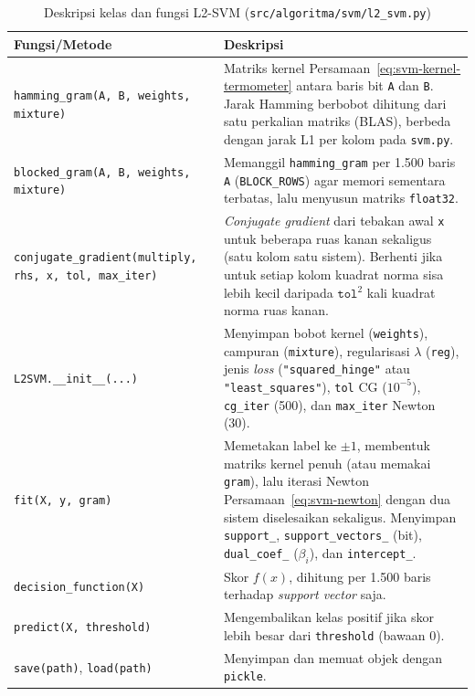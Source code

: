 \begin{table}[H]
	\centering
	\caption{Deskripsi kelas dan fungsi L2-SVM (\texttt{src/algoritma/svm/l2\_svm.py})}
	\label{tab:svm-fungsi-l2}
	\small
	\begin{tabularx}{\textwidth}{>{\raggedright\arraybackslash}p{4.8cm} Y}
		\toprule
		\textbf{Fungsi/Metode} & \textbf{Deskripsi} \\
		\midrule
		\texttt{hamming\_gram(A, B, weights, mixture)} & Matriks kernel Persamaan~\eqref{eq:svm-kernel-termometer} antara baris bit \texttt{A} dan \texttt{B}. Jarak Hamming berbobot dihitung dari satu perkalian matriks (BLAS), berbeda dengan jarak L1 per kolom pada \texttt{svm.py}. \\
		\texttt{blocked\_gram(A, B, weights, mixture)} & Memanggil \texttt{hamming\_gram} per 1.500 baris \texttt{A} (\texttt{BLOCK\_ROWS}) agar memori sementara terbatas, lalu menyusun matriks \texttt{float32}. \\
		\texttt{conjugate\_gradient(multiply, rhs, x, tol, max\_iter)} & \textit{Conjugate gradient} \cite{hestenes1952cg} dari tebakan awal \texttt{x} untuk beberapa ruas kanan sekaligus (satu kolom satu sistem). Berhenti jika untuk setiap kolom kuadrat norma sisa lebih kecil daripada $\texttt{tol}^2$ kali kuadrat norma ruas kanan. \\
		\texttt{L2SVM.\_\_init\_\_(...)} & Menyimpan bobot kernel (\texttt{weights}), campuran (\texttt{mixture}), regularisasi $\lambda$ (\texttt{reg}), jenis \textit{loss} (\texttt{"squared\_hinge"} atau \texttt{"least\_squares"}), \texttt{tol} CG ($10^{-5}$), \texttt{cg\_iter} (500), dan \texttt{max\_iter} Newton (30). \\
		\texttt{fit(X, y, gram)} & Memetakan label ke $\pm 1$, membentuk matriks kernel penuh (atau memakai \texttt{gram}), lalu iterasi Newton Persamaan~\eqref{eq:svm-newton} dengan dua sistem diselesaikan sekaligus. Menyimpan \texttt{support\_}, \texttt{support\_vectors\_} (bit), \texttt{dual\_coef\_} ($\beta_i$), dan \texttt{intercept\_}. \\
		\texttt{decision\_function(X)} & Skor $f(x)$, dihitung per 1.500 baris terhadap \textit{support vector} saja. \\
		\texttt{predict(X, threshold)} & Mengembalikan kelas positif jika skor lebih besar dari \texttt{threshold} (bawaan 0). \\
		\texttt{save(path)}, \texttt{load(path)} & Menyimpan dan memuat objek dengan \texttt{pickle}. \\
		\bottomrule
	\end{tabularx}
\end{table}

